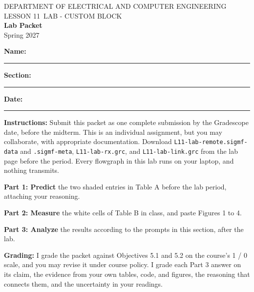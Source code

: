 \documentclass{exam}
\def\labLesson{11}
\def\thisterm{\thisTermIn}
\def\thisterm{Spring 2027}
\begin{document}
\pagestyle{headandfoot}
\begin{Form}

\begin{center}
DEPARTMENT OF ELECTRICAL AND COMPUTER ENGINEERING \\
LESSON \labLesson\ LAB - CUSTOM BLOCK \\
\textbf{Lab Packet} \\
\thisterm \\[4mm]
\end{center}

\vspace{-4pt}
\textbf{Name:} \rule[-2pt]{2.6in}{0.4pt} \hfill
\textbf{Section:} \rule[-2pt]{0.9in}{0.4pt} \hfill
\textbf{Date:} \rule[-2pt]{1.1in}{0.4pt}

\vspace{4pt}


\textbf{Instructions:} Submit this packet as one complete submission by the Gradescope date, before
the midterm. This is an individual assignment, but you may collaborate, with appropriate
documentation. Download \texttt{L11-lab-remote.sigmf-data} and \texttt{.sigmf-meta},
\texttt{L11-lab-rx.grc}, and \texttt{L11-lab-link.grc} from the lab page before the period.
Every flowgraph in this lab runs on your laptop, and nothing transmits.

\textbf{Part 1: Predict} the two shaded entries in Table A before the lab period, attaching your
reasoning.

\textbf{Part 2: Measure} the white cells of Table B in class, and paste Figures 1 to 4.

\textbf{Part 3: Analyze} the results according to the prompts in this section, after the lab.

\textbf{Grading:} I grade the packet against Objectives 5.1 and 5.2 on the course's 1 / 0 scale,
and you may revise it under course policy. I grade each Part 3 answer on its claim, the evidence
from your own tables, code, and figures, the reasoning that connects them, and the uncertainty in
your readings.

\begin{procbox}
\end{procbox}


\end{Form}
\end{document}
